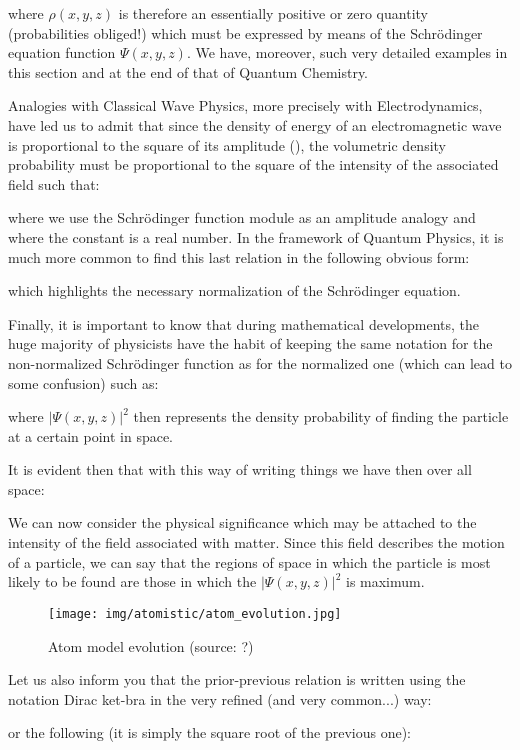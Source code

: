 	where $\rho(x,y,z)$ is therefore an essentially positive or zero quantity (probabilities obliged!) which must be expressed by means of the Schrödinger equation function $\Psi(x,y,z)$. We have, moreover, such very detailed examples in this section and at the end of that of Quantum Chemistry.
	
	Analogies with Classical Wave Physics, more precisely with Electrodynamics, have led us to admit that since the density of energy of an electromagnetic wave is proportional to the square of its amplitude (), the volumetric density probability must be proportional to the square of the intensity of the associated field such that:
	
	where we use the Schrödinger function module as an amplitude analogy and where the constant is a real number. In the framework of Quantum Physics, it is much more common to find this last relation in the following obvious form:
	
	which highlights the necessary normalization of the Schrödinger equation.
	
	Finally, it is important to know that during mathematical developments, the huge majority of physicists have the habit of keeping the same notation for the non-normalized Schrödinger function as for the normalized one (which can lead to some confusion) such as:
	
	where $\lvert\Psi(x,y,z)\rvert^2$ then represents the density probability of finding the particle at a certain point in space.
	
	It is evident then that with this way of writing things we have then over all space:
	
	We can now consider the physical significance which may be attached to the intensity of the field associated with matter. Since this field describes the motion of a particle, we can say that the regions of space in which the particle is most likely to be found are those in which the $\lvert\Psi(x,y,z)\rvert^2$ is maximum.
	\begin{figure}[H]
		\centering
		\texttt{[image: img/atomistic/atom\_evolution.jpg]}
		\caption[Atom model evolution]{Atom model evolution (source: ?)}
	\end{figure}
	Let us also inform you that the prior-previous relation is written using the notation Dirac ket-bra in the very refined (and very common...) way:
	
	or the following (it is simply the square root of the previous one):
	
